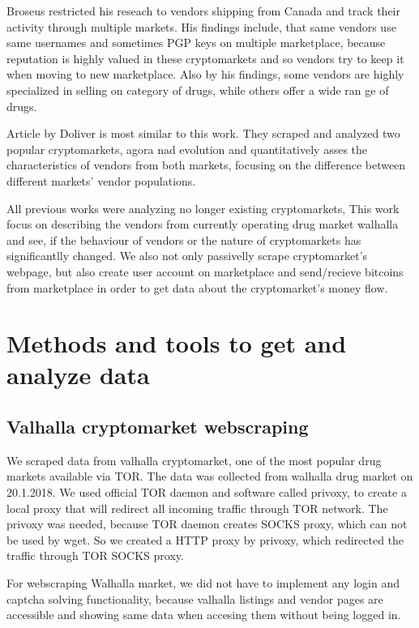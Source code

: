 \documentclass[
  digital, %
  table,   %
  lof,     %
  lot,     %
  oneside
]{fithesis3}
\begin{document}
Broseus \parencite{broseus2016studying} restricted his reseach to vendors shipping from Canada
and track their activity through multiple markets. His findings include, that same vendors
use same usernames and sometimes PGP keys on multiple marketplace, because reputation
is highly valued in these cryptomarkets and so vendors try to keep it when moving to new marketplace.
Also by his findings, some vendors are highly specialized in selling on category of drugs, while others offer a wide ran
ge of drugs.

Article by Doliver \parencite{dolliver2016characteristics} is most similar to this work.
They scraped and analyzed two popular cryptomarkets, agora nad evolution and quantitatively asses
the characteristics of vendors from both markets, focusing on the difference
 between different markets' vendor populations.

 All previous works were analyzing no longer existing cryptomarkets,
 This work focus on describing the vendors from currently operating drug market walhalla 
 and see, if the behaviour of vendors or the nature of cryptomarkets
 has significantlly changed. We also not only passivelly scrape cryptomarket's webpage,
 but also create user account on marketplace and send/recieve bitcoins from marketplace
 in order to get data about the cryptomarket's money flow.
 

\chapter{Methods and tools to get and analyze data}

\section{Valhalla cryptomarket webscraping}
We scraped data from valhalla cryptomarket, one of the most popular drug markets available via TOR.
The data was collected from walhalla drug market on 20.1.2018.
We used official TOR daemon and software called privoxy, to create a local proxy that will redirect all
incoming traffic through TOR network. The privoxy was needed, because TOR daemon creates SOCKS proxy,
which can not be used by wget. So we created a HTTP proxy by privoxy, which redirected the traffic through
TOR SOCKS proxy.

For webscraping Walhalla market, we did not have to implement any login and captcha solving functionality,
because valhalla listings and vendor pages are accessible and showing same data when accesing them without being logged in.
\end{document}
